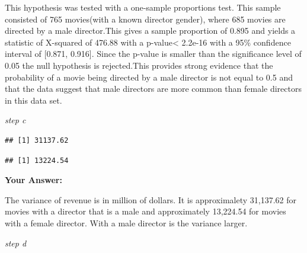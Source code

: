 \documentclass[
]{article}
\newenvironment{Shaded}{\begin{snugshade}}{\end{snugshade}}
\newcommand{\AttributeTok}[1]{\textcolor[rgb]{0.13,0.29,0.53}{#1}}
\newcommand{\ConstantTok}[1]{\textcolor[rgb]{0.56,0.35,0.01}{#1}}
\newcommand{\FloatTok}[1]{\textcolor[rgb]{0.00,0.00,0.81}{#1}}
\newcommand{\FunctionTok}[1]{\textcolor[rgb]{0.13,0.29,0.53}{\textbf{#1}}}
\newcommand{\NormalTok}[1]{#1}
\newcommand{\OtherTok}[1]{\textcolor[rgb]{0.56,0.35,0.01}{#1}}
\newcommand{\SpecialCharTok}[1]{\textcolor[rgb]{0.81,0.36,0.00}{\textbf{#1}}}
\newcommand{\StringTok}[1]{\textcolor[rgb]{0.31,0.60,0.02}{#1}}
\begin{document}
This hypothesis was tested with a one-sample proportions test. This
sample consisted of 765 movies(with a known director gender), where 685
movies are directed by a male director.This gives a sample proportion of
0.895 and yields a statistic of X-squared of 476.88 with a
p-value\textless{} 2.2e-16 with a 95\% confidence interval of {[}0.871,
0.916{]}. Since the p-value is smaller than the significance level of
0.05 the null hypothesis is rejected.This provides strong evidence that
the probability of a movie being directed by a male director is not
equal to 0.5 and that the data suggest that male directors are more
common than female directors in this data set.

\emph{step c}

\begin{Shaded}
\end{Shaded}

\begin{verbatim}
## [1] 31137.62
\end{verbatim}

\begin{verbatim}
## [1] 13224.54
\end{verbatim}

\textbf{Your Answer:}

The variance of revenue is in million of dollars. It is approximalety
31,137.62 for movies with a director that is a male and approximately
13,224.54 for movies with a female director. With a male director is the
variance larger.

\emph{step d}
\end{document}
